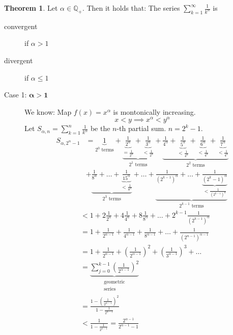 \documentclass[a4paper,landscape,twocolumn]{article}
\theoremstyle{definition}
\newtheorem{theorem}{Theorem}
\begin{document}
\begin{theorem}
  Let $\alpha \in \mathbb Q_+$. Then it holds that: The series $\sum_{k=1}^\infty \frac{1}{k^\alpha}$ is
  \begin{description}
    \item[convergent] if $\alpha > 1$
    \item[divergent] if $\alpha \leq 1$
  \end{description}
\end{theorem}
\begin{description}
  \item[Case 1: $\mathbf{\alpha > 1}$]
    We know: Map $f(x) = x^\alpha$ is montonically increasing.
    \[ x < y \implies x^\alpha < y^\alpha \]
    Let $S_{\alpha,n} = \sum_{k=1}^n \frac{1}{k^\alpha}$ be the $n$-th partial sum.
    $n = 2^k - 1$.
    \begin{align*}
      S_{\alpha,2^\alpha-1} &=
        \underbrace{1}_{2^0 \text{ terms}} +
        \underbrace{\underbrace{\frac1{2^\alpha}}_{= \frac1{2^\alpha}} + \underbrace{\frac{1}{3^\alpha}}_{< \frac1{2^\alpha}}}_{2^1 \text{ terms}} +
        \underbrace{\frac{1}{4^\alpha} + \underbrace{\frac{1}{5^\alpha}}_{< \frac1{4^\alpha}} + \underbrace{\frac{1}{6^\alpha}}_{< \frac1{4^\alpha}} + \underbrace{\frac{1}{7^\alpha}}_{< \frac1{4^\alpha}}}_{2^2 \text{ terms}} \\
      &+
        \underbrace{\frac1{8^\alpha} + \ldots + \underbrace{\frac{1}{15^\alpha}}_{< \frac1{8^\alpha}}}_{2^3 \text{ terms}}
        + \ldots +
        \underbrace{\frac{1}{\left(2^{k-1}\right)^\alpha} + \ldots + \underbrace{\frac{1}{\left(2^k - 1\right)^\alpha}}_{< \frac1{\left(2^{k-1}\right)^\alpha}}}_{2^{k-1} \text{ terms}}
    \end{align*}
    \begin{align*}
      &< 1 + 2 \frac{1}{2^\alpha} + 4 \frac{1}{4^\alpha} + 8 \frac{1}{8^\alpha} + \dots + 2^{k-1} \frac{1}{\left(2^{k-1}\right)^\alpha} \\
      &= 1 + \frac{1}{2^{\alpha-1}} + \frac{1}{4^{\alpha-1}} + \frac{1}{8^{\alpha-1}} + \dots + \frac{1}{\left(2^{n-1}\right)^{\alpha-1}} \\
      &= 1 + \frac{1}{2^{\alpha-1}} + \left(\frac{1}{2^{\alpha-1}}\right)^2 + \left(\frac{1}{3^{\alpha-1}}\right)^3 + \dots \\
      &= \underbrace{\sum_{j=0}^{k-1} \left(\frac{1}{2^{\alpha-1}}\right)^2}_{\substack{\text{geometric} \\ \text{series}}} \\
      &= \frac{1 - \left(\frac{1}{2^{\alpha-1}}\right)^2}{1 - \frac1{2^{\alpha-1}}} \\
      &< \frac{1}{1 - \frac{1}{2^{\alpha - 1}}} = \frac{2^{\alpha - 1}}{2^{\alpha - 1} - 1}
    \end{align*}


\end{description}
\end{document}
